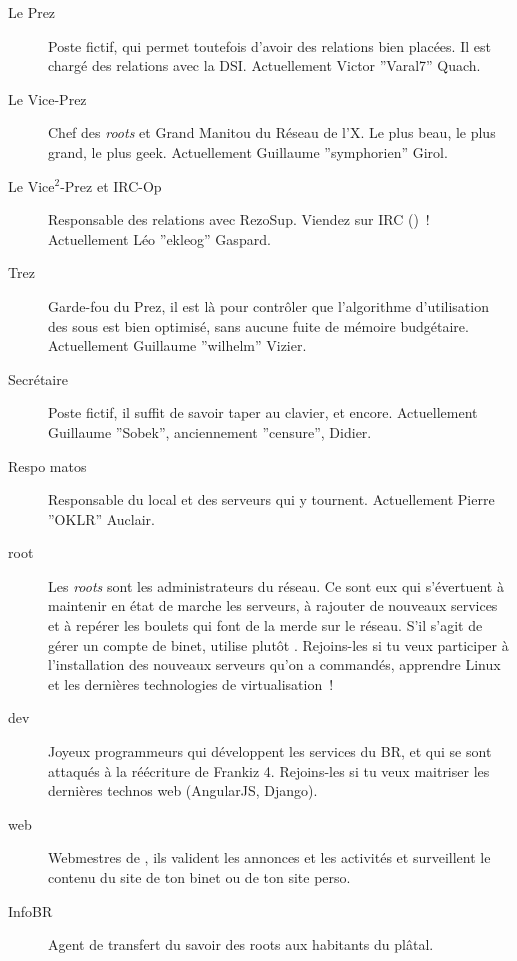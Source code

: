 \begin{description}
  \item[Le Prez]{Poste fictif, qui permet toutefois d'avoir des relations bien placées. Il est chargé des relations avec la DSI. Actuellement Victor ''Varal7'' Quach.}

  \item[Le Vice-Prez]{Chef des \emph{roots} et Grand Manitou du Réseau de l'X. Le plus beau, le plus grand, le plus geek. Actuellement Guillaume ''symphorien'' Girol.}

  \item[Le Vice$^2$-Prez et IRC-Op]{Responsable des relations avec RezoSup. Viendez sur IRC ()~! \linebreak Actuellement Léo ''ekleog'' Gaspard.}

  \item[Trez]{Garde-fou du Prez, il est là pour contrôler que l'algorithme d'utilisation des sous est bien optimisé, sans aucune fuite de mémoire budgétaire. Actuellement Guillaume ''wilhelm'' Vizier.}

  \item[Secrétaire]{Poste fictif, il suffit de savoir taper au clavier, et encore. Actuellement Guillaume ''Sobek'', anciennement ''censure'', Didier.}

  \item[Respo matos]{Responsable du local et des serveurs qui y tournent. Actuellement Pierre ''OKLR'' Auclair.}

  \item[root]{Les \emph{roots} sont les administrateurs du réseau. Ce sont eux qui s'évertuent à maintenir en état de marche les serveurs, à rajouter de
  nouveaux services et à repérer les boulets qui font de la merde sur le réseau. S'il s'agit de gérer un compte de binet, utilise plutôt . Rejoins-les si tu veux participer à l'installation des nouveaux serveurs qu'on a commandés, apprendre Linux et les dernières technologies de virtualisation~!}

  \item[dev]{Joyeux programmeurs qui développent les services du BR, et qui se sont attaqués à la réécriture de Frankiz 4. Rejoins-les si tu veux maitriser les dernières technos web (AngularJS, Django).}

  \item[web]{Webmestres de \fkz, ils valident les annonces et les activités et surveillent le contenu du site de ton binet ou de ton site perso.}

  \item[InfoBR]{Agent de transfert du savoir des roots aux habitants du plâtal.}
\end{description}
